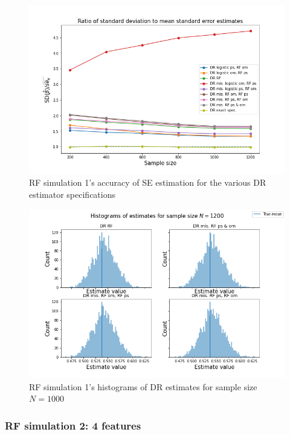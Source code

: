 \documentclass[12pt,twoside]{article}
\begin{document}
\begin{figure}[h!]
    \centering
    \includegraphics[width = 0.9\columnwidth]{figures/SERF.png}
    \caption{RF simulation 1's accuracy of \citet{lunceford_davidian} SE estimation for the various DR estimator specifications}
    \label{figSERF}
\end{figure}

\begin{figure}[h!]
    \centering
    \includegraphics[width = 0.9\columnwidth]{figures/histRF.png}
    \caption{RF simulation 1's histograms of DR estimates for sample size $N = 1000$}
    \label{fighistRF}
\end{figure}

\clearpage
\subsubsection{RF simulation 2: 4 features}
\end{document}
